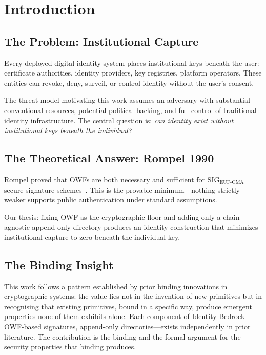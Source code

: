 \documentclass[11pt,a4paper]{article}
\begin{document}
\section{Introduction}

\subsection{The Problem: Institutional Capture}

Every deployed digital identity system places institutional keys beneath the
user: certificate authorities, identity providers, key registries, platform
operators.  These entities can revoke, deny, surveil, or control identity
without the user's consent.

The threat model motivating this work assumes an adversary with substantial
conventional resources, potential political backing, and full control of
traditional identity infrastructure.  The central question is: \emph{can
identity exist without institutional keys beneath the individual?}

\subsection{The Theoretical Answer: Rompel 1990}

Rompel proved that OWFs are both necessary and sufficient for
$\mathrm{SIG}_{\mathrm{EUF\text{-}CMA}}$ secure signature
schemes~\cite{rompel1990}.  This is the provable minimum---nothing strictly
weaker supports public authentication under standard assumptions.

Our thesis: fixing OWF as the cryptographic floor and adding only a
chain-agnostic append-only directory produces an identity construction that
minimizes institutional capture to zero beneath the individual key.

\subsection{The Binding Insight}

This work follows a pattern established by prior binding innovations in
cryptographic systems: the value lies not in the invention of new primitives
but in recognising that existing primitives, bound in a specific way, produce
emergent properties none of them exhibits alone.  Each component of Identity
Bedrock---OWF-based signatures, append-only directories---exists independently
in prior literature.  The contribution is the binding and the formal argument
for the security properties that binding produces.
\end{document}
